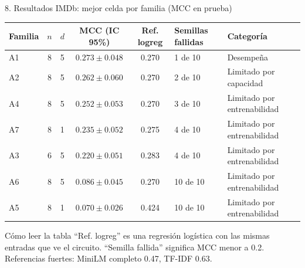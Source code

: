 \documentclass[aspectratio=169,10pt]{beamer}
\begin{document}
\begin{frame}{8. Resultados IMDb: mejor celda por familia (MCC en prueba)}
\small
\begin{tabularx}{\textwidth}{@{}lccccXl@{}}
\toprule
\textbf{Familia} & $n$ & $d$ & \textbf{MCC (IC 95\%)} & \textbf{Ref. logreg} & \textbf{Semillas fallidas} & \textbf{Categoría}\\
\midrule
A1 & 8 & 5 & $0.273\pm0.048$ & 0.270 & 1 de 10 & Desempeña\\
A2 & 8 & 5 & $0.262\pm0.060$ & 0.270 & 2 de 10 & Limitado por capacidad\\
A4 & 8 & 5 & $0.252\pm0.053$ & 0.270 & 3 de 10 & Limitado por entrenabilidad\\
A7 & 8 & 1 & $0.235\pm0.052$ & 0.275 & 4 de 10 & Limitado por entrenabilidad\\
A3 & 6 & 5 & $0.220\pm0.051$ & 0.283 & 4 de 10 & Limitado por entrenabilidad\\
A6 & 8 & 5 & $0.086\pm0.045$ & 0.270 & 10 de 10 & Limitado por entrenabilidad\\
A5 & 8 & 1 & $0.070\pm0.026$ & 0.424 & 10 de 10 & Limitado por entrenabilidad\\
\bottomrule
\end{tabularx}
\vspace{0.4em}
\begin{azulbox}{Cómo leer la tabla}
``Ref. logreg'' es una regresión logística con las mismas entradas que ve el circuito. ``Semilla fallida'' significa MCC menor a 0.2. Referencias fuertes: MiniLM completo 0.47, TF-IDF 0.63.
\end{azulbox}
\end{frame}
\end{document}
